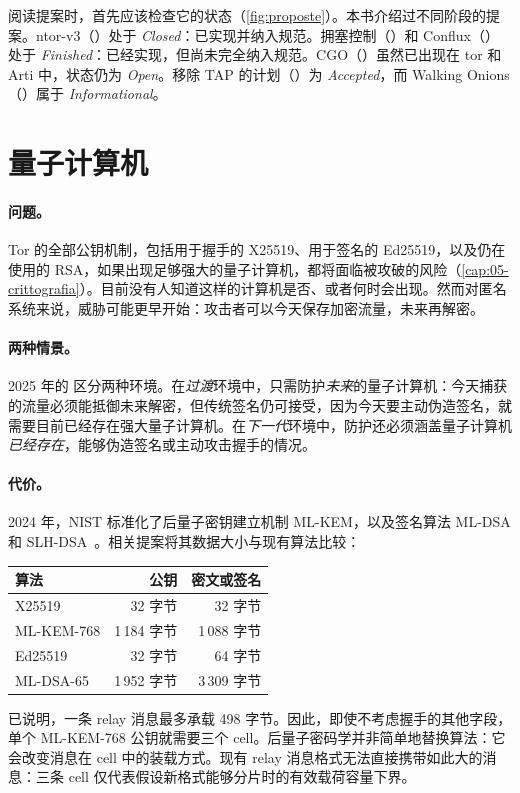 阅读提案时，首先应该检查它的状态（\cref{fig:proposte}）。本书介绍过不同阶段的提案。ntor-v3（）处于 \emph{Closed}：已实现并纳入规范。拥塞控制（）和 Conflux（）处于 \emph{Finished}：已经实现，但尚未完全纳入规范。CGO（）虽然已出现在 tor 和 Arti 中，状态仍为 \emph{Open}。移除 TAP 的计划（）为 \emph{Accepted}，而 Walking Onions（）属于 \emph{Informational}。

\section{量子计算机}\label{sec:fut-pq}

\paragraph{问题。}Tor 的全部公钥机制，包括用于握手的 X25519、用于签名的 Ed25519，以及仍在使用的 RSA，如果出现足够强大的量子计算机，都将面临被攻破的风险（\cref{cap:05-crittografia}）。目前没有人知道这样的计算机是否、或者何时会出现。然而对匿名系统来说，威胁可能更早开始：攻击者可以今天保存加密流量，未来再解密。

\paragraph{两种情景。}2025 年的  区分两种环境。在\emph{过渡}环境中，只需防护\emph{未来}的量子计算机：今天捕获的流量必须能抵御未来解密，但传统签名仍可接受，因为今天要主动伪造签名，就需要目前已经存在强大量子计算机。在\emph{下一代}环境中，防护还必须涵盖量子计算机\emph{已经存在}，能够伪造签名或主动攻击握手的情况。

\paragraph{代价。}2024 年，NIST 标准化了后量子密钥建立机制 ML-KEM，以及签名算法 ML-DSA 和 SLH-DSA~\cite{nistpqc2024}。相关提案将其数据大小与现有算法比较：
\begin{center}\small
\begin{tabular}{@{}lrr@{}}
\toprule
算法 & 公钥 & 密文或签名 \\
\midrule
X25519 & 32 字节 & 32 字节 \\
ML-KEM-768 & 1\,184 字节 & 1\,088 字节 \\
Ed25519 & 32 字节 & 64 字节 \\
ML-DSA-65 & 1\,952 字节 & 3\,309 字节 \\
\bottomrule
\end{tabular}
\end{center}
 已说明，一条 relay 消息最多承载 498 字节。因此，即使不考虑握手的其他字段，单个 ML-KEM-768 公钥就需要三个 cell。后量子密码学并非简单地替换算法：它会改变消息在 cell 中的装载方式。现有 relay 消息格式无法直接携带如此大的消息：三条 cell 仅代表假设新格式能够分片时的有效载荷容量下界。

